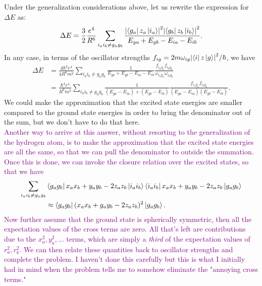 \documentclass{article}
\theoremstyle{definition}
\newcommand{\f}[2]{\frac{#1}{#2}}
\begin{document}
\begin{enumerate}[label=(\alph*)]
Under the generalization considerations above, let us rewrite the expression for $\Delta E$ as:
\begin{align*}
\Delta E = \f{3}{2}\f{e^4}{R^6} \sum_{i_ai_b \neq g_a g_b} \f{  \abs{\bra{g_a} z_a \ket{i_a}}^2  \abs{\bra{g_b} z_b \ket{i_b}}^2 }{E_{ga} + E_{gb} - E_{ia} - E_{ib}}.
\end{align*}
In any case, in terms of the oscillator strengths $f_{ig} = 2 m \omega_{ig} \abs{ \bra{i} z \ket{g}}^2 / \hbar $, we have
\begin{align*}
\Delta E 
&= \f{4 \hbar^2  e^4 }{4 R^6 m^2 } \sum_{i_a i_b \neq g_a g_b} 
\f{1}{E_{ga} + E_{gb} - E_{ia} - E_{ib}} \f{ f_{i_a g_a} f_{i_bg_b}}{  \omega_{i_a g_a} \omega_{i_b g_b}} \\
&= \f{\hbar^4 e^4 }{R^6 m^2} \sum_{i_a i_b \neq g_a g_b} 
\f{1}{ (E_{ga} - E_{ia}) + (E_{gb} - E_{ib})} \f{ f_{i_a g_a} f_{i_bg_b}}{  (E_{ga} - E_{ia}) (E_{gb} - E_{ib})}.
\end{align*}
We could make the approximation that the excited state energies are smaller compared to the ground state energies in order to bring the denominator out of the sum, but we don't have to do that here. \\


\textcolor{purple}{Another way to arrive at this answer, without resorting to the generalization of the hydrogen atom, is to make the approximation that the excited state energies are all the same, so that we can pull the denominator to outside the summation. Once this is done, we can invoke the closure relation over the excited states, so that we have
\begin{align*}
\sum_{i_a i_b \neq g_a g_b}
&\bra{g_a g_b}  x_a x_b + y_a y_b - 2 z_a z_b   \ket{i_a i_b}   
 \bra{i_a i_b}  x_a x_b + y_a y_b - 2 z_a z_b  \ket{g_a g_b}   \\
&\approx \bra{g_a g_b} (x_a x_b + y_a y_b - 2z_a z_b)^2 \ket{g_a g_b}.
\end{align*}
Now further assume that the ground state is spherically symmetric, then all the expectation values of the cross terms are zero. All that's left are contributions due to the $x_a^2, y_a^2,\dots$ terms, which are simply a \textit{third} of the expectation values of $r^2_a, r_b^2$. We can then relate these quantities back to oscillator strengths and complete the problem. I haven't done this carefully but this is what I initially had in mind when the problem tells me to somehow eliminate the "annoying cross terms."
}



\end{enumerate}
\end{document}
